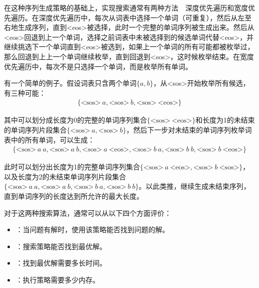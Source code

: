 \parinterval 在这种序列生成策略的基础上，实现搜索通常有两种方法\ \dash\ 深度优先遍历和宽度优先遍历。在深度优先遍历中，每次从词表中选择一个单词（可重复），然后从左至右地生成序列，直到<eos>被选择，此时一个完整的单词序列被生成出来。然后从<eos>回退到上一个单词，选择之前词表中未被选择到的候选单词代替<eos>，并继续挑选下一个单词直到<eos>被选到，如果上一个单词的所有可能都被枚举过，那么回退到上上一个单词继续枚举，直到回退到<sos>，这时候枚举结束。在宽度优先遍历中，每次不是只选择一个单词，而是枚举所有单词。

\parinterval 有一个简单的例子。假设词表只含两个单词$\{a, b\}$，从<sos>开始枚举所有候选，有三种可能：
\begin{eqnarray}
\{\text{<sos>}\ a, \text{<sos>}\ b, \text{<sos>}\ \text{<eos>}\} \nonumber
\end{eqnarray}

\noindent 其中可以划分成长度为0的完整的单词序列集合$\{\text{<sos>}\ \text{<eos>}\}$和长度为1的未结束的单词序列片段集合$\{\text{<sos>}\ a, \text{<sos>}\ b\}$，然后下一步对未结束的单词序列枚举词表中的所有单词，可以生成：
\begin{eqnarray}
\{\text{<sos>}\ a\ a, \text{<sos>}\ a\ b, \text{<sos>}\ a\ \text{<eos>}, \text{<sos>}\ b\ a, \text{<sos>}\ b\ b, \text{<sos>}\ b\ \text{<eos>}\} \nonumber
\end{eqnarray}

\parinterval 此时可以划分出长度为1的完整单词序列集合$\{\text{<sos>}\ a\ \text{<eos>}, \text{<sos>}\ b\ \text{<sos>}\}$，以及长度为2的未结束单词序列片段集合$\{\text{<sos>}\ a\ a, \text{<sos>}\ a\ b, \text{<sos>}\ b\ a, \text{<sos>}\ b\ b\}$。以此类推，继续生成未结束序列，直到单词序列的长度达到所允许的最大长度。

\parinterval 对于这两种搜索算法，通常可以从以下四个方面评价：

\begin{itemize}
\vspace{0.5em}
\item {\small{}}：当问题有解时，使用该策略能否找到问题的解。
\vspace{0.5em}
\item {\small{}}：搜索策略能否找到最优解。
\vspace{0.5em}
\item {\small{}}：找到最优解需要多长时间。
\vspace{0.5em}
\item {\small{}}：执行策略需要多少内存。
\vspace{0.5em}
\end{itemize}

